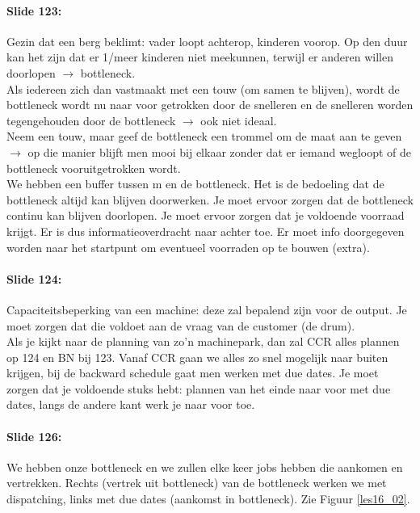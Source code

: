 \documentclass[10pt,a4paper]{report}
\begin{document}
\paragraph{Slide 123:} Gezin dat een berg beklimt: vader loopt achterop, kinderen voorop. Op den duur kan het zijn dat er 1/meer kinderen niet meekunnen, terwijl er anderen willen doorlopen $\rightarrow$ bottleneck.\\
Als iedereen zich dan vastmaakt met een touw (om samen te blijven), wordt de bottleneck wordt nu naar voor getrokken door de snelleren en de snelleren worden tegengehouden door de bottleneck $\rightarrow$ ook niet ideaal.\\
Neem een touw, maar geef de bottleneck een trommel om de maat aan te geven $\rightarrow$ op die manier blijft men mooi bij elkaar zonder dat er iemand wegloopt of de bottleneck vooruitgetrokken wordt.\\
We hebben een buffer tussen m en de bottleneck. Het is de bedoeling dat de bottleneck altijd kan blijven doorwerken. Je moet ervoor zorgen dat de bottleneck continu kan blijven doorlopen. Je moet ervoor zorgen dat je voldoende voorraad krijgt. Er is dus informatieoverdracht naar achter toe. Er moet info doorgegeven worden naar het startpunt om eventueel voorraden op te bouwen (extra).

\paragraph{Slide 124:} Capaciteitsbeperking van een machine: deze zal bepalend zijn voor de output. Je moet zorgen dat die voldoet aan de vraag van de customer (de drum).\\
Als je kijkt naar de planning van zo'n machinepark, dan zal CCR alles plannen op 124 en BN bij 123. Vanaf CCR gaan we alles zo snel mogelijk naar buiten krijgen, bij de backward schedule gaat men werken met due dates. Je moet zorgen dat je voldoende stuks hebt: plannen van het einde naar voor met due dates, langs de andere kant werk je naar voor toe.

\paragraph{Slide 126:} We hebben onze bottleneck en we zullen elke keer jobs hebben die aankomen en vertrekken. Rechts (vertrek uit bottleneck) van de bottleneck werken we met dispatching, links met due dates (aankomst in bottleneck). Zie Figuur \ref{les16_02}.\\
\end{document}
